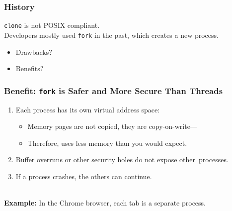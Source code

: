 \documentclass[aspectratio=43]{beamer}
\newenvironment{changemargin}[1]{%
  \begin{list}{}{%
    \setlength{\topsep}{0pt}%
    \setlength{\leftmargin}{#1}%
    \setlength{\rightmargin}{1em}
    \setlength{\listparindent}{\parindent}%
    \setlength{\itemindent}{\parindent}%
    \setlength{\parsep}{\parskip}%
  }%
  \item[]}{\end{list}}
\begin{document}
\begin{frame}[fragile]
  \frametitle{History}

  \begin{changemargin}{2.5cm}
    {\tt clone} is not POSIX compliant.
    ~\\
    Developers mostly used {\tt fork} in the past, which creates a new process.
      \begin{itemize}
        \item Drawbacks?
        \item Benefits?
      \end{itemize}
  \end{changemargin}
\end{frame}

\begin{frame}[fragile]
  \frametitle{Benefit: {\tt fork} is Safer and More Secure Than Threads}

  \begin{changemargin}{1cm}
  \begin{enumerate}
    \item Each process has its own virtual address space:
      \begin{itemize}
        \item Memory pages are not copied, they are copy-on-write---
        \item Therefore, uses less memory than you would expect.
      \end{itemize}
    \item Buffer overruns or other security holes do not expose other~processes.
    \item If a process crashes, the others can continue.
  \end{enumerate}~\\[1em]
  {\bf Example:} In the Chrome browser, each tab is a separate process.
  \end{changemargin}
\end{frame}
\end{document}
